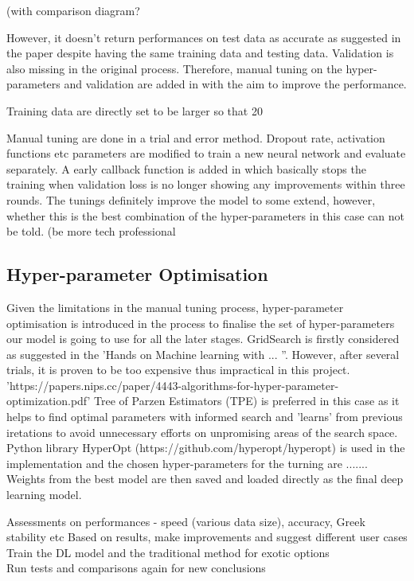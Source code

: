 \documentclass{report}
\begin{document}
(with comparison diagram? 

However, it doesn't return  performances on test data as accurate as suggested in the paper despite having the same training data and testing data. Validation is also missing in the original process. Therefore, manual tuning on the hyper-parameters and validation are added in with the aim to improve the performance.

Training data are directly set to be larger so that 20%

Manual tuning are done in a trial and error method. Dropout rate, activation functions etc parameters are modified to train a new neural network and evaluate separately. A early callback function is added in which basically stops the training when validation loss is no longer showing any improvements within three rounds. The tunings definitely improve the model to some extend, however, whether this is the best combination of the hyper-parameters in this case can not be told. (be more tech professional

\subsection{Hyper-parameter Optimisation}
Given the limitations in the manual tuning process, hyper-parameter optimisation is introduced in the process to finalise the set of hyper-parameters our model is going to use for all the later stages. GridSearch is firstly considered as suggested in the 'Hands on Machine learning with ... ''. However, after several trials, it is proven to be too expensive thus impractical in this project. 'https://papers.nips.cc/paper/4443-algorithms-for-hyper-parameter-optimization.pdf' Tree of Parzen Estimators (TPE) is preferred in this case as it helps to find optimal parameters with informed search and 'learns' from previous iretations to avoid unnecessary efforts on unpromising areas of the search space. Python library HyperOpt (https://github.com/hyperopt/hyperopt) is used in the implementation and the chosen hyper-parameters for the turning are ....... Weights from the best model are then saved and loaded directly as the final deep learning model.

Assessments on performances - speed (various data size), accuracy, Greek stability etc
Based on results, make improvements and suggest different user cases\\
Train the DL model and the traditional method for exotic options\\
Run tests and comparisons again for new conclusions
\end{document}
